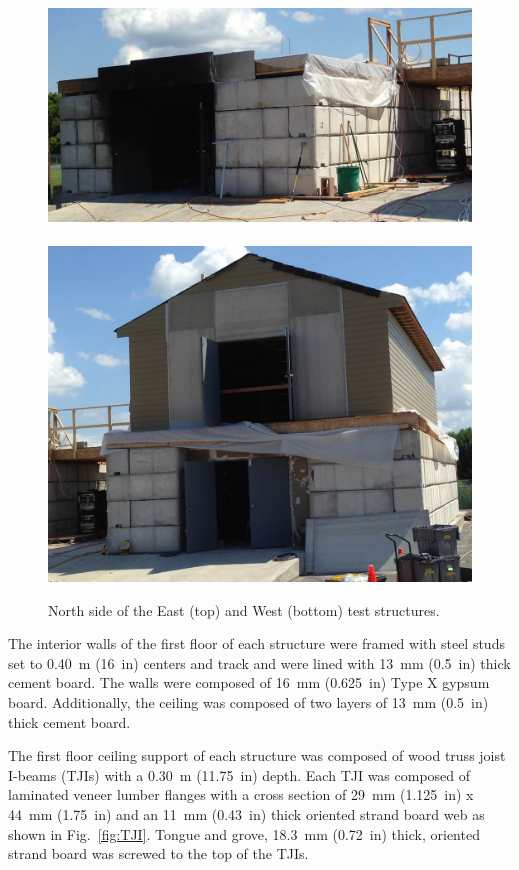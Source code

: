 \documentclass[12pt,oneside]{book}
\begin{document}
\begin{figure}[!ht]
	\includegraphics[width=5.25in]{../../Hose_Stream_Tests/Figures/Pictures/east_structure}
	\\~\\
	\includegraphics[width=5.25in]{../../Hose_Stream_Tests/Figures/Pictures/west_structure}
	\caption[North side of the East and West Structures.]{North side of the East (top) and West (bottom) test structures.}
	\label{fig:struct_pics}
\end{figure}

The interior walls of the first floor of each structure were framed with steel studs set to 0.40~m (16~in) centers and track and were lined with 13~mm (0.5~in) thick cement board. The walls were composed of 16~mm (0.625~in) Type X gypsum board. Additionally, the ceiling was composed of two layers of 13~mm (0.5~in) thick cement board.
\FloatBarrier

The first floor ceiling support of each structure was composed of wood truss joist I-beams (TJIs) with a 0.30~m (11.75~in) depth. Each TJI was composed of laminated veneer lumber flanges with a cross section of 29~mm (1.125~in) x 44~mm (1.75~in) and an 11~mm (0.43~in) thick oriented strand board web as shown in Fig.~\ref{fig:TJI}. Tongue and grove, 18.3~mm (0.72~in) thick, oriented strand board was screwed to the top of the TJIs.
\end{document}
